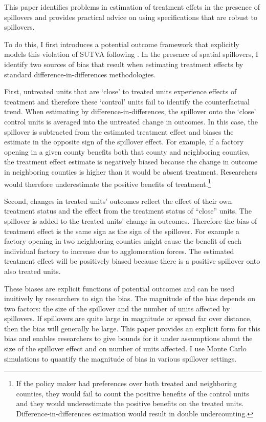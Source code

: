 \documentclass[11pt]{article}
\begin{document}
This paper identifies problems in estimation of treatment effets in the presence of spillovers and provides practical advice on using specifications that are robust to spillovers.

To do this, I first introduces a potential outcome framework that explicitly models this violation of SUTVA following \citet{Vazquez-Bare_2019}. In the presence of spatial spillovers, I identify two sources of bias that result when estimating treatment effects by standard difference-in-differences methodologies.

First, untreated units that are `close' to treated units experience effects of treatment and therefore these `control' units fail to identify the counterfactual trend. When estimating by difference-in-differences, the spillover onto the `close' control units is averaged into the untreated change in outcomes. In this case, the spillover is subtracted from the estimated treatment effect and biases the estimate in the opposite sign of the spillover effect. For example, if a factory opening in a given county benefits both that county and neighboring counties, the treatment effect estimate is negatively biased because the change in outcome in neighboring counties is higher than it would be absent treatment. Researchers would therefore underestimate the positive benefits of treatment.\footnote{If the policy maker had preferences over both treated and neighboring counties, they would fail to count the positive benefits of the control units and they would underestimate the positive benefits on the treated units. Difference-in-differences estimation would result in double undercounting.}

Second, changes in treated units' outcomes reflect the effect of their own treatment status and the effect from the treatment status of ``close'' units. The spillover is added to the treated units' change in outcomes. Therefore the bias of treatment effect is the same sign as the sign of the spillover. For example a factory opening in two neighboring counties might cause the benefit of each individual factory to increase due to agglomeration forces. The estimated treatment effect will be positively biased because there is a positive spillover onto also treated units. 

These biases are explicit functions of potential outcomes and can be used inuitively by researchers to sign the bias. The magnitude of the bias depends on two factors: the size of the spillover and the number of units affected by spillovers. If spillovers are quite large in magnitude or spread far over distance, then the bias will generally be large. This paper provides an explicit form for this bias and enables researchers to give bounds for it under assumptions about the size of the spillover effect and on number of units affected. I use Monte Carlo simulations to quantify the magnitude of bias in various spillover settings.
\end{document}
